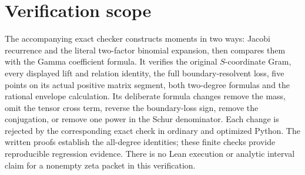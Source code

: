 \documentclass[11pt]{article}
\begin{document}
\section{Verification scope}

The accompanying exact checker constructs moments in two ways:
Jacobi recurrence and the literal two-factor binomial expansion,
then compares them with the Gamma coefficient formula. It verifies
the original $S$-coordinate Gram, every displayed lift and relation
identity, the full boundary-resolvent loss, five points on its actual
positive matrix segment, both two-degree formulas and the rational
envelope calculation. Its deliberate formula changes remove the
mass, omit the tensor cross term, reverse the boundary-loss sign,
remove the conjugation, or remove one power in the Schur denominator.
Each change is rejected by the corresponding exact check in ordinary
and optimized Python. The written proofs establish the all-degree
identities; these finite checks provide reproducible regression evidence.
There is no Lean execution or analytic interval claim for a nonempty
zeta packet in this verification.
\end{document}
